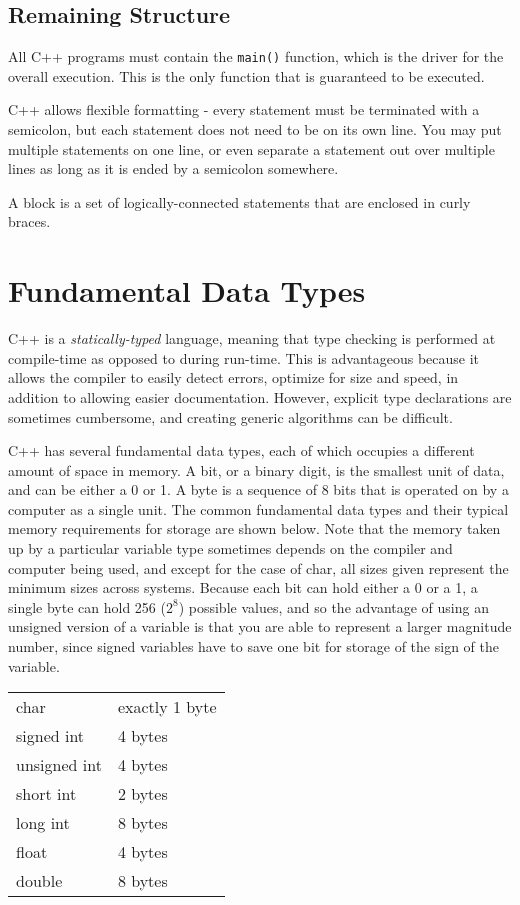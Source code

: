 \documentclass[10pt]{article}
\begin{document}
\subsection{Remaining Structure}

All C++ programs must contain the \texttt{main()} function, which is the driver for the overall execution. This is the only function that is guaranteed to be executed. 

C++ allows flexible formatting - every statement must be terminated with a semicolon, but each statement does not need to be on its own line. You may put multiple statements on one line, or even separate a statement out over multiple lines as long as it is ended by a semicolon somewhere.

A block is a set of logically-connected statements that are enclosed in curly braces.

\section{Fundamental Data Types}

C++ is a \textit{statically-typed} language, meaning that type checking is performed at compile-time as opposed to during run-time. This is advantageous because it allows the compiler to easily detect errors, optimize for size and speed, in addition to allowing easier documentation. However, explicit type declarations are sometimes cumbersome, and creating generic algorithms can be difficult.

C++ has several fundamental data types, each of which occupies a different amount of space in memory. A bit, or a binary digit, is the smallest unit of data, and can be either a 0 or 1. A byte is a sequence of 8 bits that is operated on by a computer as a single unit. The common fundamental data types and their typical memory requirements for storage are shown below. Note that the memory taken up by a particular variable type sometimes depends on the compiler and computer being used, and except for the case of char, all sizes given represent the minimum sizes across systems. Because each bit can hold either a 0 or a 1, a single byte can hold 256 (\(2^8\)) possible values, and so the advantage of using an unsigned version of a variable is that you are able to represent a larger magnitude number, since signed variables have to save one bit for storage of the sign of the variable. 

\begin{center}
\begin{tabular} {l l}
char & exactly 1 byte \\
signed int & 4 bytes\\
unsigned int & 4 bytes\\
short int & 2 bytes\\
long int & 8 bytes\\
float & 4 bytes\\
double & 8 bytes\\
\end{tabular}
\end{center}
\end{document}

